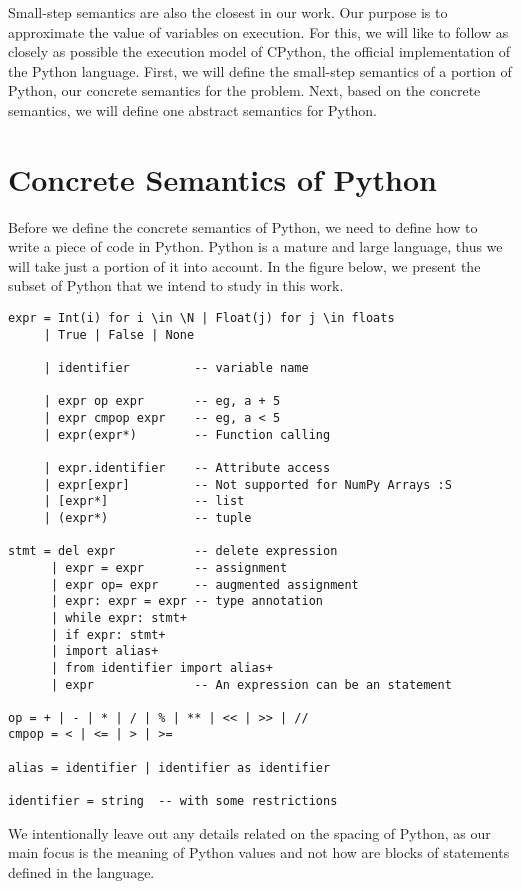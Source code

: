 Small-step semantics are also the closest in our work. Our purpose is to approximate the
value of variables on execution. For this, we will like to follow as closely as possible
the execution model of CPython, the official implementation of the Python language. First,
we will define the small-step semantics of a portion of Python, our concrete semantics
for the problem. Next, based on the concrete semantics, we will define one abstract
semantics for Python.

\section{Concrete Semantics of Python}

Before we define the concrete semantics of Python, we need to define how to write a piece
of code in Python. Python is a mature and large language, thus we will take just a portion
of it into account. In the figure below, we present the subset of Python that we intend to
study in this work.

\begin{verbatim}
expr = Int(i) for i \in \N | Float(j) for j \in floats
     | True | False | None

     | identifier         -- variable name

     | expr op expr       -- eg, a + 5
     | expr cmpop expr    -- eg, a < 5
     | expr(expr*)        -- Function calling

     | expr.identifier    -- Attribute access
     | expr[expr]         -- Not supported for NumPy Arrays :S
     | [expr*]            -- list
     | (expr*)            -- tuple

stmt = del expr           -- delete expression
      | expr = expr       -- assignment
      | expr op= expr     -- augmented assignment
      | expr: expr = expr -- type annotation
      | while expr: stmt+
      | if expr: stmt+
      | import alias+
      | from identifier import alias+
      | expr              -- An expression can be an statement

op = + | - | * | / | % | ** | << | >> | //
cmpop = < | <= | > | >=

alias = identifier | identifier as identifier

identifier = string  -- with some restrictions
\end{verbatim}

We intentionally leave out any details related on the spacing of Python, as our main focus
is the meaning of Python values and not how are blocks of statements defined in the
language.

